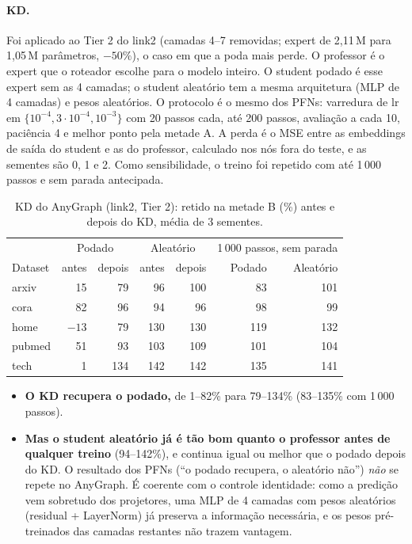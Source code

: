 \documentclass[12pt,a4paper]{article}
\begin{document}
\paragraph{KD.} Foi aplicado ao Tier 2 do link2 (camadas 4--7 removidas; expert de 2,11\,M para 1,05\,M parâmetros, $-50\%$), o caso em que a poda mais perde. O professor é o expert que o roteador escolhe para o modelo inteiro. O student podado é esse expert sem as 4 camadas; o student aleatório tem a mesma arquitetura (MLP de 4 camadas) e pesos aleatórios. O protocolo é o mesmo dos PFNs: varredura de lr em $\{10^{-4}, 3\cdot10^{-4}, 10^{-3}\}$ com 20 passos cada, até 200 passos, avaliação a cada 10, paciência 4 e melhor ponto pela metade A. A perda é o MSE entre as embeddings de saída do student e as do professor, calculado nos nós fora do teste, e as sementes são 0, 1 e 2. Como sensibilidade, o treino foi repetido com até 1\,000 passos e sem parada antecipada.

\begin{table}[H]
\centering
\caption{KD do AnyGraph (link2, Tier 2): retido na metade B (\%) antes e depois do KD, média de 3 sementes.}
\label{tab:any-kd}
\begin{tabular}{@{}lrrrr|rr@{}}
\toprule
 & \multicolumn{2}{c}{Podado} & \multicolumn{2}{c|}{Aleatório} & \multicolumn{2}{c}{1\,000 passos, sem parada} \\
Dataset & antes & depois & antes & depois & Podado & Aleatório \\
\midrule
arxiv  & 15  & 79  & 96  & 100 & 83  & 101 \\
cora   & 82  & 96  & 94  & 96  & 98  & 99 \\
home   & $-13$ & 79 & 130 & 130 & 119 & 132 \\
pubmed & 51  & 93  & 103 & 109 & 101 & 104 \\
tech   & 1   & 134 & 142 & 142 & 135 & 141 \\
\bottomrule
\end{tabular}
\end{table}

\begin{itemize}
  \item \textbf{O KD recupera o podado,} de 1--82\% para 79--134\% (83--135\% com 1\,000 passos).
  \item \textbf{Mas o student aleatório já é tão bom quanto o professor antes de qualquer treino} (94--142\%), e continua igual ou melhor que o podado depois do KD. O resultado dos PFNs (``o podado recupera, o aleatório não'') \emph{não} se repete no AnyGraph. É coerente com o controle identidade: como a predição vem sobretudo dos projetores, uma MLP de 4 camadas com pesos aleatórios (residual + LayerNorm) já preserva a informação necessária, e os pesos pré-treinados das camadas restantes não trazem vantagem.
\end{itemize}
\end{document}

